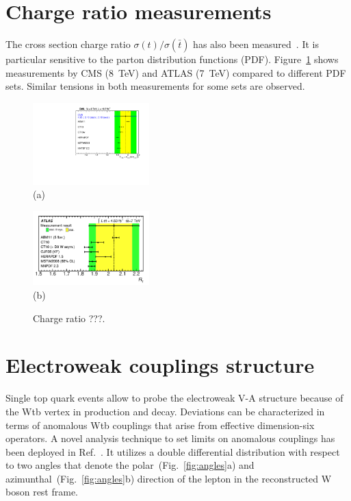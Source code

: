 \documentclass{PoS}
\begin{document}
\section{Charge ratio measurements}
The cross section charge ratio $\sigma(t)/\sigma(\bar{t})$ has also been measured~\cite{atlas-charge7,cms-xsec8}. It is particular sensitive to the parton distribution functions (PDF). Figure~\ref{fig:charge-ratio} shows measurements by CMS (8~TeV) and ATLAS (7~TeV) compared to different PDF sets. Similar tensions in both measurements for some sets are observed. 

\begin{figure}[htbp]
\begin{center}
\parbox[t]{0.45\textwidth}{\centering\includegraphics[width=0.4\textwidth]{cms_xsec8/charge.pdf}\\(a)}
\parbox[t]{0.45\textwidth}{\centering\includegraphics[width=0.4\textwidth]{atlas_charge7/charge.pdf}\\(b)}
\end{center}
\caption{\label{fig:charge-ratio}Charge ratio ???.}

\end{figure}

\section{Electroweak couplings structure}
Single top quark events allow to probe the electroweak V-A structure because of the Wtb vertex in production and decay. Deviations can be characterized in terms of anomalous Wtb couplings that arise from effective dimension-six operators. A novel analysis technique to set limits on anomalous couplings has been deployed in Ref.~\cite{atlas-anomcoupl}. It utilizes a double differential distribution with respect to two angles that denote the polar~(Fig.~\ref{fig:angles}a) and azimunthal~(Fig.~\ref{fig:angles}b) direction of the lepton in the reconstructed W boson rest frame.
\end{document}
